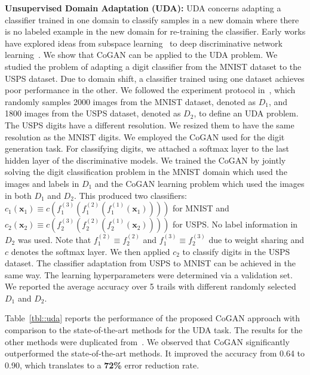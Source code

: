 {\bf Unsupervised Domain Adaptation (UDA):} UDA concerns adapting a classifier trained in one domain to classify samples in a new domain where there is no labeled example in the new domain for re-training the classifier. Early works have explored ideas from subspace learning~\cite{long2013transfer,fernando2015joint} to deep discriminative network learning~\cite{tzeng2014deep,rozantsev2016beyond,ganin2016domain}. We show that CoGAN can be applied to the UDA problem. We studied the problem of adapting a digit classifier from the MNIST dataset to the USPS dataset. Due to domain shift, a classifier trained using one dataset achieves poor performance in the other. We followed the experiment protocol in~\cite{long2013transfer,rozantsev2016beyond}, which randomly samples 2000 images from the MNIST dataset, denoted as $D_1$, and 1800 images from the USPS dataset, denoted as $D_2$, to define an UDA problem. The USPS digits have a different resolution. We resized them to have the same resolution as the MNIST digits. We employed the CoGAN used for the digit generation task. For classifying digits, we attached a softmax layer to the last hidden layer of the discriminative models. We trained the CoGAN by jointly solving the digit classification problem in the MNIST domain which used the images and labels in $D_1$ and the CoGAN learning problem which used the images in both $D_1$ and $D_2$. This produced two classifiers: $c_1(\mathbf{x}_1)\equiv c(f_1^{(3)}(f_1^{(2)}(f_1^{(1)}(\mathbf{x}_1))))$ for MNIST and $c_2(\mathbf{x}_2)\equiv c(f_2^{(3)}(f_2^{(2)}(f_2^{(1)}(\mathbf{x}_2))))$ for USPS. No label information in $D_2$ was used. Note that $f_1^{(2)}\equiv f_2^{(2)}$ and $f_1^{(3)}\equiv f_2^{(3)}$ due to weight sharing and $c$ denotes the softmax layer. We then applied $c_2$ to classify digits in the USPS dataset. The classifier adaptation from USPS to MNIST can be achieved in the same way. The learning hyperparameters were determined via a validation set. We reported the average accuracy over 5 trails with different randomly selected $D_1$ and $D_2$.

Table~\ref{tbl::uda} reports the performance of the proposed CoGAN approach with comparison to the state-of-the-art methods for the UDA task. The results for the other methods were duplicated from~\cite{rozantsev2016beyond}. We observed that CoGAN significantly outperformed the state-of-the-art methods. It improved the accuracy from 0.64 to 0.90, which translates to a {\bf 72\%} error reduction rate.

